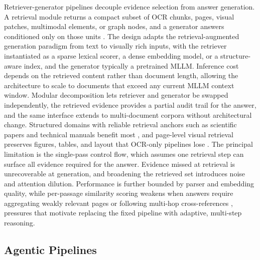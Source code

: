 \documentclass[11pt]{article}
\begin{document}
Retriever-generator pipelines decouple evidence selection from answer generation. A retrieval module returns a compact subset of OCR chunks, pages, visual patches, multimodal elements, or graph nodes, and a generator answers conditioned only on those units \cite{cho2024m3docrag, tanaka2025vdocrag}. The design adapts the retrieval-augmented generation paradigm from text \cite{lewis2020retrievalaugmented, guu2020realm} to visually rich inputs, with the retriever instantiated as a sparse lexical scorer, a dense embedding model, or a structure-aware index, and the generator typically a pretrained MLLM. Inference cost depends on the retrieved content rather than document length, allowing the architecture to scale to documents that exceed any current MLLM context window. Modular decomposition lets retriever and generator be swapped independently, the retrieved evidence provides a partial audit trail for the answer, and the same interface extends to multi-document corpora without architectural change. Structured domains with reliable retrieval anchors such as scientific papers and technical manuals benefit most \cite{shin2025multidocfusion}, and page-level visual retrieval preserves figures, tables, and layout that OCR-only pipelines lose \cite{tanaka2025vdocrag, xie2024wukong}. The principal limitation is the single-pass control flow, which assumes one retrieval step can surface all evidence required for the answer. Evidence missed at retrieval is unrecoverable at generation, and broadening the retrieved set introduces noise and attention dilution. Performance is further bounded by parser and embedding quality, while per-passage similarity scoring weakens when answers require aggregating weakly relevant pages or following multi-hop cross-references \cite{wang2024knowledge, wu2025molorag}, pressures that motivate replacing the fixed pipeline with adaptive, multi-step reasoning.

\subsection{Agentic Pipelines}
\label{sec:arch-agent}
\end{document}
